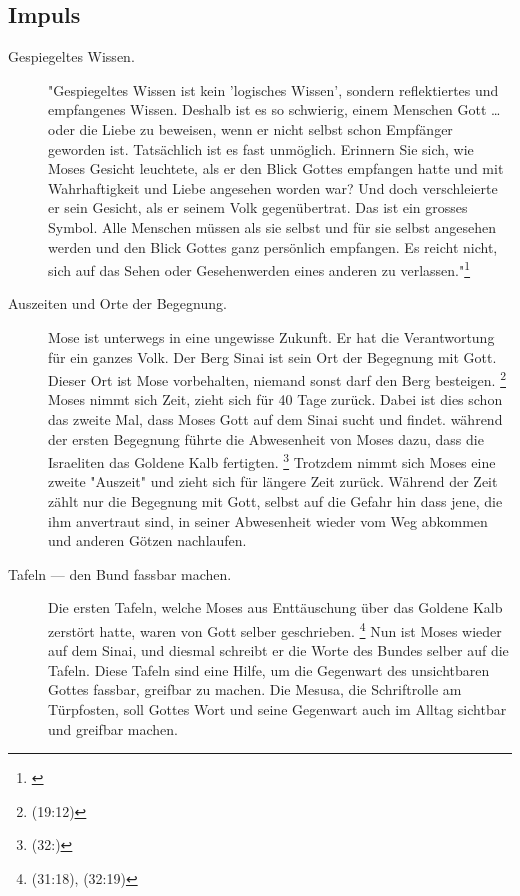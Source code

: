 \subsection{Impuls}
\begin{impuls}
\begin{description}
\item[Gespiegeltes Wissen.] "Gespiegeltes Wissen ist kein 'logisches Wissen', sondern reflektiertes und empfangenes Wissen. Deshalb ist es so schwierig, einem Menschen Gott … oder die Liebe zu beweisen, wenn er nicht selbst schon Empfänger geworden ist. Tatsächlich ist es fast unmöglich. Erinnern Sie sich, wie Moses Gesicht leuchtete, als er den Blick Gottes empfangen hatte und mit Wahrhaftigkeit und Liebe angesehen worden war? Und doch verschleierte er sein Gesicht, als er seinem Volk gegenübertrat. Das ist ein grosses Symbol. Alle Menschen müssen als sie selbst und für sie selbst angesehen werden und den Blick Gottes ganz persönlich empfangen. Es reicht nicht, sich auf das Sehen oder Gesehenwerden eines anderen zu verlassen."\footnote{\cite[48]{Tanz}}
\item[Auszeiten und Orte der Begegnung.] Mose ist unterwegs in eine ungewisse Zukunft. Er hat die Verantwortung für ein ganzes Volk. Der Berg Sinai ist sein Ort der Begegnung mit Gott. Dieser Ort ist Mose vorbehalten, niemand sonst darf den Berg besteigen. 
\footnote{
(19:12)
}
Moses nimmt sich Zeit, zieht sich für 40 Tage zurück. Dabei ist dies schon das zweite Mal, dass Moses Gott auf dem Sinai sucht und findet. während der ersten Begegnung führte die Abwesenheit von Moses dazu, dass die Israeliten das Goldene Kalb fertigten.
\footnote{
(32:)
}
Trotzdem nimmt sich Moses eine zweite "Auszeit" und zieht sich für längere Zeit zurück. Während der Zeit zählt nur die Begegnung mit Gott, selbst auf die Gefahr hin dass jene, die ihm anvertraut sind, in seiner Abwesenheit wieder vom Weg abkommen und anderen Götzen nachlaufen. 
\item[Tafeln — den Bund fassbar machen.] Die ersten Tafeln, welche Moses aus Enttäuschung über das Goldene Kalb zerstört hatte, waren von Gott selber geschrieben. 
\footnote{
(31:18),
(32:19)
}
Nun ist Moses wieder auf dem Sinai, und diesmal schreibt er die Worte des Bundes selber auf die Tafeln. Diese Tafeln sind eine Hilfe, um die Gegenwart des unsichtbaren Gottes fassbar, greifbar zu machen. Die Mesusa, die Schriftrolle am Türpfosten, soll Gottes Wort und seine Gegenwart auch im Alltag sichtbar und greifbar machen.


\end{description}
\end{impuls}
